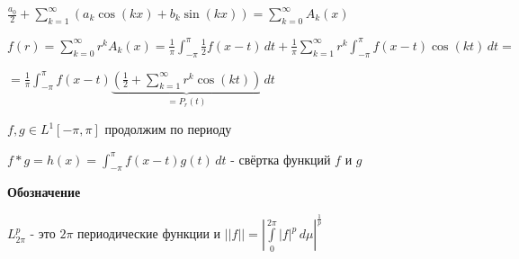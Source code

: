 \begin{example}
    $\frac{a_0}{2} + \sum\limits_{k = 1}^\infty (a_k \cos (kx) + b_k \sin (kx)) = \sum\limits_{k = 0}^\infty A_k (x)$

    $f(r) = \sum\limits_{k = 0}^\infty r^k A_k (x) = \frac{1}{\pi} \int_{-\pi}^\pi \frac{1}{2} f(x - t) \, dt + \frac{1}{\pi} \sum\limits_{k=1}^\infty r^k \int_{-\pi}^\pi f(x - t) \cos (kt) \, dt = $

    $= \frac{1}{\pi} \int_{-\pi}^\pi f(x - t) \underbrace{\left( \frac{1}{2} + \sum\limits_{k = 1}^\infty r^k \cos (kt) \right)}_{= P_r (t)} \, dt$
\end{example}

\begin{definition}
    $f, g \in L^1 [-\pi, \pi]$ продолжим по периоду

    $f * g = h(x) = \int_{-\pi}^\pi f(x - t) g(t) \, dt$ - свёртка функций $f$ и $g$
\end{definition}

\begin{remark}
    \textbf{Обозначение}

    $L_{2\pi}^p$ - это $2\pi$ периодические функции и $||f|| = \left| \int\limits_0^{2\pi} |f|^p \, d \mu \right|^{\frac{1}{p}}$
\end{remark}

